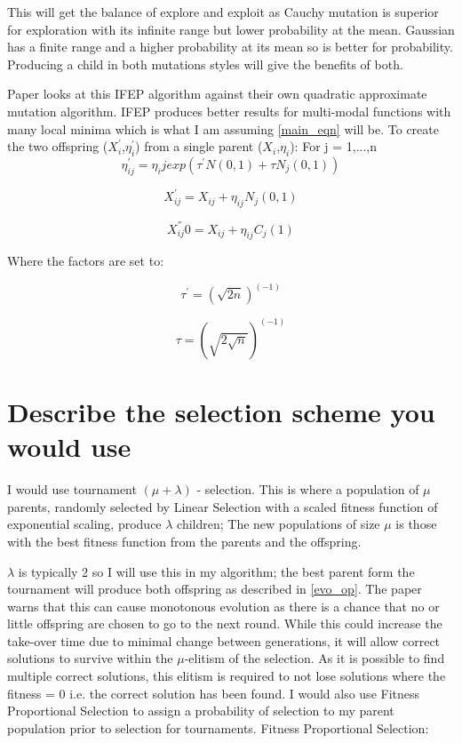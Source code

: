 \documentclass{article}
\begin{document}
This will get the balance of explore and exploit as Cauchy mutation is superior for exploration with its infinite range but lower probability at the mean. Gaussian has a finite range and a higher probability at its mean so is better for probability. Producing a child in both mutations styles will give the benefits of both.

Paper \cite{landscape} looks at this IFEP algorithm against their own quadratic approximate mutation algorithm. IFEP produces better results for multi-modal functions with many local minima which is what I am assuming \ref{main_eqn} will be.
 \smallbreak
To create the two offspring ($X_i^′$,$\eta_i^′$) from a single parent ($X_i$,$\eta_i$):
\smallbreak
For j = 1,...,n
\smallbreak
\begin{equation}
\eta_{ij}^{'} = \eta_ij exp(\tau_{}^{'}N(0, 1) + \tau N_j (0, 1))
\end{equation}

\begin{equation}
X_{ij}^{'} = X_{ij} + \eta_{ij}N_j(0,1)
\end{equation}

\begin{equation}
X_{ij}^{''}0 = X_{ij} + \eta_{ij}C_j(1)
\end{equation}

Where the factors are set to:

\begin{equation}
\tau^{′} = (\sqrt{2n})^(-1)
\end{equation}

\begin{equation}
\tau = (\sqrt{2\sqrt{n}})^(-1)
\end{equation}

\section{Describe the selection scheme you would use}

I would use tournament $(\mu + \lambda)$ - selection. This is where a population of $\mu$ parents, randomly selected by Linear Selection with a scaled fitness function of exponential scaling, produce $\lambda$ children; The new populations of size $\mu$ is those with the best fitness function from the parents and the offspring.

$\lambda$ is typically 2 \cite{selective_pressure} so I will use this in my algorithm; the best parent form the tournament will produce both offspring as described in \ref{evo_op}. The paper warns that this can cause monotonous evolution as there is a chance that no or little offspring are chosen to go to the next round. While this could increase the take-over time due to minimal change between generations, it will allow correct solutions to survive within the $\mu$-elitism of the selection. As it is possible to find multiple correct solutions, this elitism is required to not lose solutions where the fitness = 0 i.e. the correct solution has been found.   
\bigbreak
I would also use Fitness Proportional Selection to assign a probability of selection to my parent population prior to selection for tournaments. 
\smallbreak
Fitness Proportional Selection:
\end{document}
